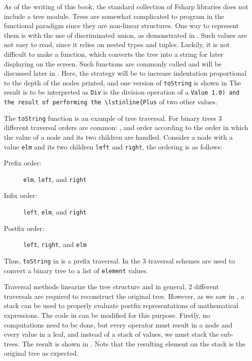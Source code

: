 \documentclass[fsharpNotes.tex]{subfiles}
\begin{document}
As of the writing of this book, the standard collection of Fsharp libraries does not include a tree module. Trees are somewhat complicated to program in the functional paradigm since they are non-linear structures. One way to represent them is with the use of discriminated union, as demonstrated in .
%
% 
Such values are not easy to read, since it relies on nested types and tuples. Luckily, it is not difficult to make a function, which converts the tree into a string for later displaying on the screen. Such functions are commonly called  and will be discussed later in . Here, the strategy will be to increase indentation proportional to the depth of the nodes printed, and one version of \lstinline{toString} is shown in 
%
%
The result is to be interpreted as \lstinline{Div} is the division operation of a \lstinline{Value 1.0) and the result of performing the \lstinline{Plus} of two other values.
  
  The \lstinline{toString} function is an example of tree traversal. For binary trees 3 different traversal orders are common: ,  and  order according to the order in which the value of a node and its two children are handled. Consider a node with a value \lstinline{elm} and its two children \lstinline{left} and \lstinline{right}, the ordering is as follows:
\begin{description}
\item[Prefix order:] \lstinline{elm}, \lstinline{left}, and \lstinline{right}
\item[Infix order:] \lstinline{left}, \lstinline{elm}, and \lstinline{right}
\item[Postfix order:] \lstinline{left}, \lstinline{right}, and \lstinline{elm} 
\end{description}
Thus, \lstinline{toString} in  is a prefix traversal. In  the 3 traversal schemes are used to convert a binary tree to a list of \lstinline{element} values.
%
%

Traversal methods linearize the tree structure and in general, 2 different traversals are required to reconstruct the original tree. However, as we saw in , a stack can be used to properly evaluate postfix representations of mathematical expressions. The code in  can be modified for this purpose. Firstly, no computations need to be done, but every operator must result in a node and every value in a leaf, and instead of a stack of values, we must stack the sub-trees. The result is shown in .
% 
%
Note that the resulting element on the stack is the original tree as expected.
\end{document}
